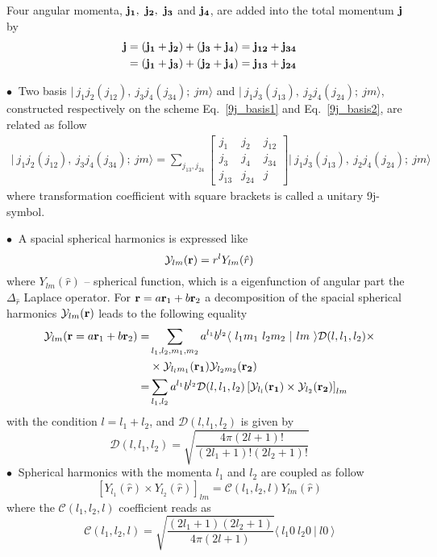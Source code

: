 Four angular momenta, $\bf j_1,~j_2,~j_3$ and $\bf j_4$, are added into the total momentum $\bf j$ by
\begin{align}
\label{9j_basis1}
\bf j & =\bf \left( j_1 + j_2 \right) + ( j_3 + j_4) = j_{12} + j_{34} \\
\label{9j_basis2}		
& = \bf ( j_1 + j_3 ) + \left( j_2  + j_4 \right) = j_{13} +j_{24}
\end{align}

$\bullet~$  Two basis  $\vert~ j_1 j_2 (j_{12}),~j_3 j_4 (j_{34});~jm \rangle$ and $\vert~ j_1 j_3 (j_{13}),~j_2 j_4 (j_{24});~jm \rangle $, constructed respectively on the scheme Eq.~\ref{9j_basis1} and Eq.~\ref{9j_basis2},  are related as follow
\begin{align}
\label{9j}
\vert~ j_1 j_2 (j_{12}),~j_3 j_4 (j_{34});~jm \rangle = \sum_{j_{13},j_{24}} 
\begin{bmatrix}
j_1 & j_2 & j_{12} \\ 
j_3 & j_4 & j_{34} \\ 
j_{13} & j_{24} & j
\end{bmatrix} 
\vert~ j_1 j_3 (j_{13}),~j_2 j_4 (j_{24});~jm \rangle 
\end{align}
where transformation coefficient with square brackets is called a unitary 9j-symbol.


$\bullet~$   A spacial spherical harmonics is expressed like
  \begin{equation}
  \mathcal{Y}_{lm}({\bf r}) = r^{l} Y_{lm}(\hat{r})
  \end{equation}
  where $Y_{lm}(\hat{r})$  -- spherical function, which is a eigenfunction of angular part the $\Delta_{\hat{r}}$ Laplace operator.
  For ${\bf r} = a{\bf r}_1+b {\bf r}_2$ a decomposition of the spacial spherical harmonics $\mathcal{Y}_{lm}({\bf r})$ leads to the following equality
  \begin{align}
  \mathcal{Y}_{lm}({\bf r} = a{\bf r}_1+b {\bf r}_2)=& \sum_{l_1,l_2,m_1,m_2} a^{l_1} b^{l_2}
  \langle ~ l_1 m_1~l_2 m_2~ \vert ~l m~  \rangle \mathcal{D}(l,l_1,l_2) \times \nonumber \\
   & \times \mathcal{Y}_{l_l m_1}({\bf r_1})  \mathcal{Y}_{l_2 m_2}({\bf r_2}) \nonumber \\
   = & \sum_{l_1,l_2} a^{l_1} b^{l_2}
   \mathcal{D}(l,l_1,l_2) \left[ \mathcal{Y}_{l_l}({\bf r_1}) \times \mathcal{Y}_{l_2}({\bf r_2}) \right]_{lm} 
  \end{align}
  with the condition $l=l_1+l_2$, and $\mathcal{D}(l,l_1,l_2) $ is given by
  \begin{equation}
  \label{sphHarmDecomp}
  \mathcal{D}(l,l_1,l_2)  = \sqrt{\frac{4 \pi (2l+1)!}{(2l_1+1)! (2l_2+1)!}}
  \end{equation}
$\bullet~$  Spherical harmonics with the momenta $l_1$ and $l_2$ are coupled as follow
\begin{equation}
\left[ Y_{l_1}(\hat{r}) \times Y_{l_2}(\hat{r})\right]_{lm} =  \mathcal{C}(l_1,l_2,l) Y_{lm}(\hat{r})
\end{equation}
where the $\mathcal{C}(l_1,l_2,l)$ coefficient reads as
\begin{equation}
\mathcal{C}(l_1,l_2,l) = \sqrt{\frac{(2l_1+1)(2l_2+1)}{4 \pi (2l+1)}} \langle ~ l_1 0~l_2 0~ \vert ~l 0~  \rangle
\end{equation}

